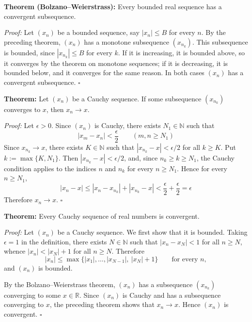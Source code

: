 \documentclass[a4paper,11pt,abstracton]{scrartcl}
\newcommand{\RR}{\mathbb{R}}
\newcommand{\NN}{\mathbb{N}}
\theoremstyle{dotlessP}
\theoremstyle{dotlessS}
\theoremstyle{remark}
\theoremstyle{definition}
\begin{document}
\begin{problem_box}
\textbf{Theorem (Bolzano--Weierstrass):}
Every bounded real sequence has a convergent subsequence.
\end{problem_box}

\begin{claim_box}
\textit{Proof:}
Let $(x_n)$ be a bounded sequence, say $|x_n|\le B$ for every $n$. By the preceding theorem, $(x_n)$ has a monotone subsequence $(x_{n_k})$. This subsequence is bounded, since $|x_{n_k}|\le B$ for every $k$. If it is increasing, it is bounded above, so it converges by the theorem on monotone sequences; if it is decreasing, it is bounded below, and it converges for the same reason. In both cases $(x_n)$ has a convergent subsequence.
\hfill$\square$
\end{claim_box}

\begin{problem_box}
\textbf{Theorem:}
Let $(x_n)$ be a Cauchy sequence. If some subsequence $(x_{n_k})$ converges to $x$, then $x_n\rightarrow x$.
\end{problem_box}

\begin{claim_box}
\textit{Proof:}
Let $\epsilon>0$. Since $(x_n)$ is Cauchy, there exists $N_1\in\NN$ such that
\[
    |x_m-x_n|<\frac\epsilon2\qquad(m,n\ge N_1)
\]
Since $x_{n_k}\rightarrow x$, there exists $K\in\NN$ such that $|x_{n_k}-x|<\epsilon/2$ for all $k\ge K$. Put $k:=\max\{K,N_1\}$. Then $|x_{n_k}-x|<\epsilon/2$, and, since $n_k\ge k\ge N_1$, the Cauchy condition applies to the indices $n$ and $n_k$ for every $n\ge N_1$. Hence for every $n\ge N_1$,
\[
    |x_n-x|\le|x_n-x_{n_k}|+|x_{n_k}-x|<\frac\epsilon2+\frac\epsilon2=\epsilon
\]
Therefore $x_n\rightarrow x$.
\hfill$\square$
\end{claim_box}

\begin{problem_box}
\textbf{Theorem:}
Every Cauchy sequence of real numbers is convergent.
\end{problem_box}

\begin{claim_box}
\textit{Proof:}
Let $(x_n)$ be a Cauchy sequence. We first show that it is bounded. Taking $\epsilon=1$ in the definition, there exists $N\in\NN$ such that $|x_n-x_N|<1$ for all $n\ge N$, whence $|x_n|<|x_N|+1$ for all $n\ge N$. Therefore
\[
    |x_n|\le\max\{|x_1|,\ldots,|x_{N-1}|,\ |x_N|+1\}\qquad\text{for every }n,
\]
and $(x_n)$ is bounded.

By the Bolzano--Weierstrass theorem, $(x_n)$ has a subsequence $(x_{n_k})$ converging to some $x\in\RR$. Since $(x_n)$ is Cauchy and has a subsequence converging to $x$, the preceding theorem shows that $x_n\rightarrow x$. Hence $(x_n)$ is convergent.
\hfill$\square$
\end{claim_box}
\end{document}
